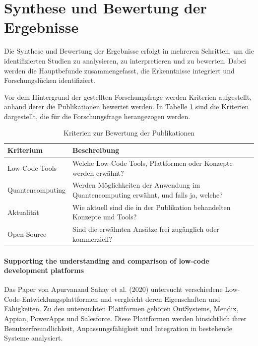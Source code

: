 
\section{Synthese und Bewertung der Ergebnisse}
Die Synthese und Bewertung der Ergebnisse erfolgt in mehreren Schritten, um die identifizierten Studien zu analysieren, 
zu interpretieren und zu bewerten. Dabei werden die Hauptbefunde zusammengefasst, die Erkenntnisse integriert und 
Forschungslücken identifiziert. 

Vor dem Hintergrund der gestellten Forschungsfrage werden Kriterien aufgestellt, anhand derer die Publikationen 
bewertet werden. In Tabelle \ref{tab:evaluation_criteria} sind die Kriterien dargestellt, die für die Forschungsfrage 
herangezogen werden. 

\begin{table}[h!]
    \centering
    \caption{Kriterien zur Bewertung der Publikationen}
    \label{tab:evaluation_criteria}
    \begin{tabular}{|p{5cm}|p{9cm}|}
    \hline
    \textbf{Kriterium} & \textbf{Beschreibung} \\ \hline
    Low-Code Tools & Welche Low-Code Tools, Plattformen oder Konzepte werden erwähnt? \\ \hline
    Quantencomputing & Werden Möglichkeiten der Anwendung im Quantencomputing erwähnt, und falls ja, welche? \\ \hline
    Aktualität & Wie aktuell sind die in der Publikation behandelten Konzepte und Tools? \\ \hline
    Open-Source & Sind die erwähnten Ansätze frei zugänglich oder kommerziell? \\ \hline
    \end{tabular}
\end{table}

\paragraph{Supporting the understanding and comparison of low-code development platforms}

Das Paper von Apurvanand Sahay et al. (2020) untersucht verschiedene Low-Code-Entwicklungsplattformen und vergleicht deren 
Eigenschaften und Fähigkeiten. Zu den untersuchten Plattformen gehören OutSystems, Mendix, Appian, PowerApps und Salesforce. 
Diese Plattformen werden hinsichtlich ihrer Benutzerfreundlichkeit, Anpassungsfähigkeit und Integration in bestehende Systeme analysiert.

